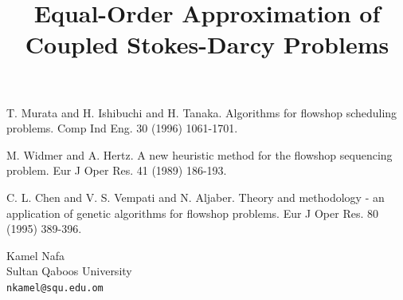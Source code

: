 \documentclass[article,A4,11pt]{llncs}%
\begin{document}

\begin{thebibliography}{10}
{\sc T. Murata and H. Ishibuchi and H. Tanaka}. {Algorithms for flowshop scheduling problems}. Comp Ind Eng. 30 (1996) 1061-1701.

{\sc M. Widmer and A. Hertz}. {A new heuristic method for the flowshop sequencing problem}. Eur J Oper Res. 41 (1989) 186-193.

{\sc C. L. Chen and V. S. Vempati and N. Aljaber}. {Theory and methodology - an application of genetic algorithms for flowshop problems}. Eur J Oper Res. 80 (1995) 389-396.
\end{thebibliography}

\title{Equal-Order Approximation of Coupled Stokes-Darcy Problems}
 \author{} \institute{}
\maketitle
\begin{center}
{\large Kamel Nafa}\\
Sultan Qaboos University\\
{\tt nkamel@squ.edu.om}
\end{center}
\end{document}
